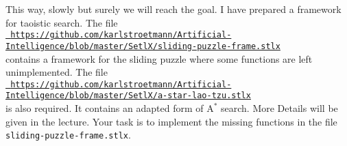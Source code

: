 This way, slowly but surely we will reach the goal.  I have prepared a framework for taoistic search.  The file
\\[0.2cm]
\hspace*{-0.5cm}
\href{https://github.com/karlstroetmann/Artificial-Intelligence/blob/master/SetlX/sliding-puzzle-frame.stlx}{\texttt{\footnotesize
    https://github.com/karlstroetmann/Artificial-Intelligence/blob/master/SetlX/sliding-puzzle-frame.stlx}}
\\[0.2cm]
contains a framework for the sliding puzzle where some functions are left unimplemented.  The file
\\[0.2cm]
\hspace*{0.5cm}
\href{https://github.com/karlstroetmann/Artificial-Intelligence/blob/master/SetlX/a-star-lao-tzu.stlx}{\texttt{\footnotesize
    https://github.com/karlstroetmann/Artificial-Intelligence/blob/master/SetlX/a-star-lao-tzu.stlx}}
\\[0.2cm]
is also required.  It contains an adapted form of $\mathrm{A}^*$ search.  More Details will be given in the
lecture.  Your task is to implement the missing functions in the file \texttt{sliding-puzzle-frame.stlx}.
\eox


